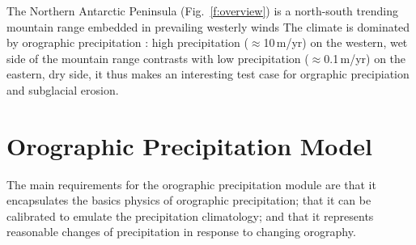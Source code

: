 \documentclass[11pt]{article}
\begin{document}
The Northern Antarctic Peninsula (Fig.~\ref{f:overview}) is a north-south trending mountain range embedded in prevailing westerly winds The climate is dominated by orographic precipitation \citep[Fig.~\ref{f:overview}D and][]{Simmonds2003}: high precipitation ($\approx$10\,m/yr) on the western, wet side of the mountain range contrasts with low precipitation ($\approx$0.1\,m/yr) on the eastern, dry side, it thus makes an interesting test case for orgraphic precipiation and subglacial erosion.

\section{Orographic Precipitation Model}

The main requirements for the orographic precipitation module are that it encapsulates the basics physics of orographic precipitation; that it can be calibrated to emulate the precipitation climatology; and that it represents reasonable changes of precipitation in response to changing orography. 
\end{document}
